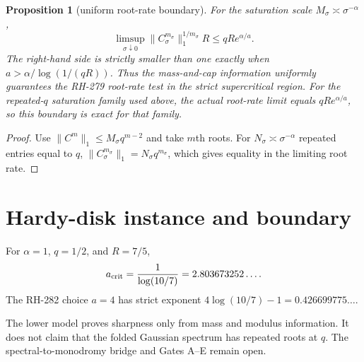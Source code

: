 \documentclass[11pt]{article}
\newtheorem{proposition}[theorem]{Proposition}
\theoremstyle{remark}\newtheorem{remark}[theorem]{Remark}
\begin{document}
\begin{proposition}[uniform root-rate boundary]
For the saturation scale $M_\sigma\asymp\sigma^{-\alpha}$,
\[
 \limsup_{\sigma\downarrow0}
 \|C_\sigma^{m_\sigma}\|_1^{1/m_\sigma}R
 \le qR e^{\alpha/a}.
\]
The right-hand side is strictly smaller than one exactly when
$a>\alpha/\log(1/(qR))$.  Thus the mass-and-cap information uniformly
guarantees the RH-279 root-rate test in the strict supercritical region.
For the repeated-$q$ saturation family used above, the actual root-rate
limit equals $qRe^{\alpha/a}$, so this boundary is exact for that family.
\end{proposition}
\begin{proof}
Use $\|C^m\|_1\le M_\sigma q^{m-2}$ and take $m$th roots.  For
$N_\sigma\asymp\sigma^{-\alpha}$ repeated entries equal to $q$,
$\|C_\sigma^{m_\sigma}\|_1=N_\sigma q^{m_\sigma}$, which gives equality
in the limiting root rate.
\end{proof}

\section{Hardy-disk instance and boundary}
For $\alpha=1$, $q=1/2$, and $R=7/5$,
\[
 a_{\rm crit}=\frac1{\log(10/7)}=2.803673252\ldots .
\]
The RH-282 choice $a=4$ has strict exponent
$4\log(10/7)-1=0.426699775\ldots$.

The lower model proves sharpness only from mass and modulus information.  It
does not claim that the folded Gaussian spectrum has repeated roots at $q$.
The spectral-to-monodromy bridge and Gates A--E remain open.
\end{document}

